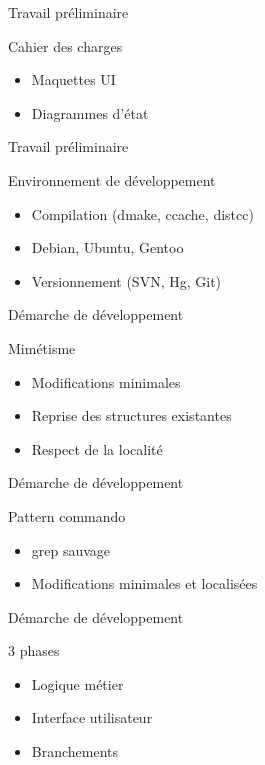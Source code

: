 \documentclass[handout]{beamer}
\begin{document}
\begin{frame}{Travail préliminaire}
    \begin{block}{Cahier des charges}
        \begin{itemize}[<+->]
            \item Maquettes UI
            \item Diagrammes d'état
        \end{itemize}
    \end{block}
\end{frame}

\begin{frame}{Travail préliminaire}
    \begin{block}{Environnement de développement}
        \begin{itemize}[<+->]
            \item Compilation (dmake, ccache, distcc)
            \item Debian, Ubuntu, Gentoo
            \item Versionnement (SVN, Hg, Git)
        \end{itemize}
    \end{block}
\end{frame}

\begin{frame}{Démarche de développement}
    \begin{block}{Mimétisme}
        \begin{itemize}[<+->]
            \item Modifications minimales
            \item Reprise des structures existantes 
            \item Respect de la localité
        \end{itemize}
    \end{block}
\end{frame}

\begin{frame}{Démarche de développement}
    \begin{block}{Pattern commando}
        \begin{itemize}[<+->]
            \item grep sauvage
            \item Modifications minimales et localisées
        \end{itemize}
    \end{block}
\end{frame}

\begin{frame}{Démarche de développement}
    \begin{block}{3 phases}
        \begin{itemize}[<+->]
            \item Logique métier
            \item Interface utilisateur
            \item Branchements
        \end{itemize}
    \end{block}
\end{frame}
\end{document}
